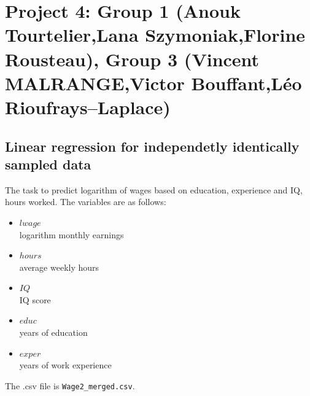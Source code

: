 \documentclass{article}
\begin{document}
\section*{Project 4: Group 1 (Anouk Tourtelier,Lana Szymoniak,Florine Rousteau), Group 3 (Vincent MALRANGE,Victor Bouffant,Léo Rioufrays--Laplace) }
 \subsection*{Linear regression for independetly identically sampled data}
   The task to predict logarithm of wages based on education, experience and IQ, hours worked. The variables are as follows:
   \begin{itemize}
   \item{$lwage$ \\}                    logarithm monthly earnings
   \item{$hours$ \\}                    average weekly hours
   \item{$IQ$ \\}                      IQ score
   \item{$educ$ \\}                     years of education
   \item{$exper$ \\}                    years of work experience
   \end{itemize}


   The .csv file is \lstinline$Wage2_merged.csv$.

\end{document}
